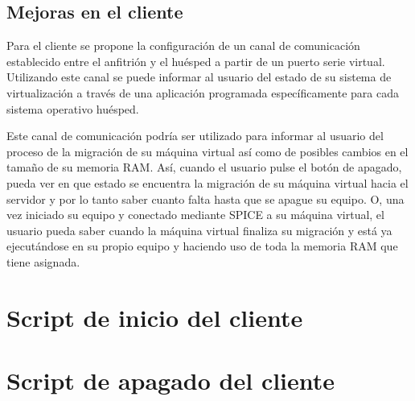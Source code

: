 \documentclass[spanisheDIVcalc,twoside,parskip-,pointlessnumbers,final]{scrbook}
\newcommand{\clearemptydoublepage}{\newpage{\pagestyle{empty}\cleardoublepage}}
\begin{document}
\section{Mejoras en el cliente}

Para el cliente se propone la configuración de un canal de comunicación
establecido entre el anfitrión y el huésped a partir de un puerto
serie virtual. Utilizando este canal se puede informar al usuario
del estado de su sistema de virtualización a través de una aplicación
programada específicamente para cada sistema operativo huésped.

Este canal de comunicación podría ser utilizado para informar al usuario
del proceso de la migración de su máquina virtual así como de posibles
cambios en el tamaño de su memoria RAM. Así, cuando el usuario pulse
el botón de apagado, pueda ver en que estado se encuentra la migración
de su máquina virtual hacia el servidor y por lo tanto saber cuanto
falta hasta que se apague su equipo. O, una vez iniciado su equipo
y conectado mediante SPICE a su máquina virtual, el usuario pueda
saber cuando la máquina virtual finaliza su migración y está ya ejecutándose
en su propio equipo y haciendo uso de toda la memoria RAM que tiene
asignada.



\appendix
\clearemptydoublepage
\chapter{Script de inicio del cliente}





\clearemptydoublepage
\chapter{Script de apagado del cliente}




\end{document}
